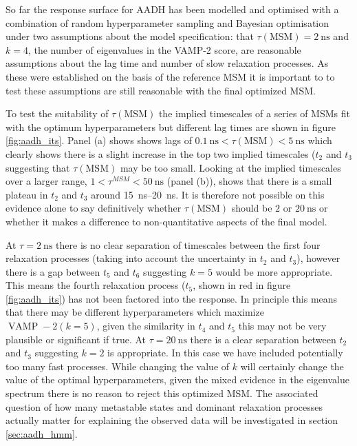 So far the response surface for AADH has been modelled and optimised with a combination of random hyperparameter sampling and Bayesian optimisation under two assumptions about the model specification: that $\tau(\mathrm{MSM}) = \SI{2}{\nano\second}$ and $k=4$, the number of eigenvalues in the VAMP-2 score, are reasonable assumptions about the lag time and number of slow relaxation processes. As these were established on the basis of the reference MSM it is important to to test these assumptions are still reasonable with the final optimized MSM. 

To test the suitability of $\tau(\mathrm{MSM})$ the implied timescales of a series of MSMs fit with the optimum hyperparameters but different lag times are shown in figure \ref{fig:aadh_its}. Panel (a) shows shows lags of  $\SI{0.1}{\nano\second} < \tau(\mathrm{MSM}) < \SI{5}{\nano\second}$ which clearly shows there is a slight increase in the top two implied timescales ($t_{2}$ and $t_{3}$ suggesting that $\tau(\mathrm{MSM})$ may be too small. Looking at the implied timescales over a larger range, $1 < \tau^{MSM} < \SI{50}{\nano\second}$ (panel (b)), shows that there is a small plateau in $t_{2}$ and $t_{3}$  around  \SIrange{15}{20}{\nano\second}. It is therefore not possible on this evidence alone to say definitively whether $\tau(\mathrm{MSM})$ should be $2$ or $\SI{20}{\nano\second}$ or whether it makes a difference to non-quantitative aspects of the final model.  

At $\tau = \SI{2}{\nano\second}$ there is no clear separation of timescales between the first four relaxation processes (taking into account the uncertainty in $t_{2}$ and $t_{3}$), however there is a gap between $t_{5}$ and $t_{6}$ suggesting $k=5$ would be more appropriate. This means the fourth relaxation process ($t_{5}$, shown in red in figure \ref{fig:aadh_its}) has not been factored into the response. In principle this means that there may be different hyperparameters which maximize $\operatorname{VAMP}-2(k=5)$,  given the similarity in $t_{4}$ and $t_{5}$ this may not be very plausible or significant if true. At $\tau = \SI{20}{\nano\second}$ there is a clear separation between $t_{2}$ and $t_{3}$ suggesting $k=2$ is appropriate. In this case we have included potentially too many fast processes. While changing the value of $k$ will certainly change the value of the optimal hyperparameters, given the mixed evidence in the eigenvalue spectrum there is no reason to reject this optimized MSM. The associated question of how many metastable states and dominant relaxation processes actually matter for explaining the observed data will be investigated in section \ref{sec:aadh_hmm}. 

